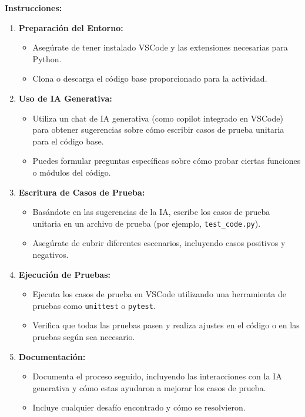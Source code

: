 \textbf{Instrucciones:}
\begin{enumerate}
    \item \textbf{Preparación del Entorno:}
    \begin{itemize}
        \item Asegúrate de tener instalado VSCode y las extensiones necesarias para Python.
        \item Clona o descarga el código base proporcionado para la actividad.
    \end{itemize}
    
    \item \textbf{Uso de IA Generativa:}
    \begin{itemize}
        \item Utiliza un chat de IA generativa (como copilot integrado en VSCode) para obtener sugerencias sobre cómo escribir casos de prueba unitaria para el código base.
        \item Puedes formular preguntas específicas sobre cómo probar ciertas funciones o módulos del código.
    \end{itemize}
    
    \item \textbf{Escritura de Casos de Prueba:}
    \begin{itemize}
        \item Basándote en las sugerencias de la IA, escribe los casos de prueba unitaria en un archivo de prueba (por ejemplo, \texttt{test\_code.py}).
        \item Asegúrate de cubrir diferentes escenarios, incluyendo casos positivos y negativos.
    \end{itemize}
    
    \item \textbf{Ejecución de Pruebas:}
    \begin{itemize}
        \item Ejecuta los casos de prueba en VSCode utilizando una herramienta de pruebas como \texttt{unittest} o \texttt{pytest}.
        \item Verifica que todas las pruebas pasen y realiza ajustes en el código o en las pruebas según sea necesario.
    \end{itemize}
    
    \item \textbf{Documentación:}
    \begin{itemize}
        \item Documenta el proceso seguido, incluyendo las interacciones con la IA generativa y cómo estas ayudaron a mejorar los casos de prueba.
        \item Incluye cualquier desafío encontrado y cómo se resolvieron.
    \end{itemize}
\end{enumerate}


